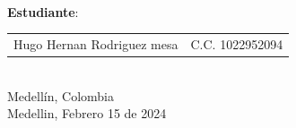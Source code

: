 \begin{titlepage}
\begin{minipage}{13.5cm}
\HRule \\[1.5cm]

{\large \textbf{Estudiante}:\\[0.3cm]

\begin{tabular}{cc}
Hugo Hernan Rodriguez mesa & C.C. 1022952094\\
\end{tabular}
}\\[2.5cm]

{\large
Medellín, Colombia
}\\[0.3cm]

{\large
Medellin, Febrero 15 de 2024
}

\end{minipage}

\vfill %

\end{titlepage}



